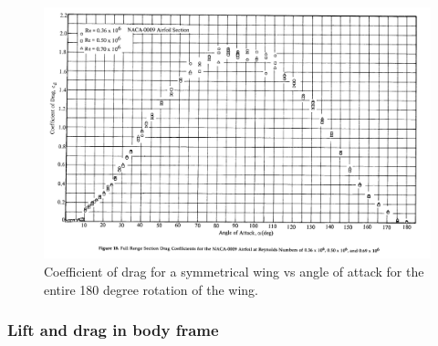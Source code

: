 \begin{figure}[h]
    \center
    \includegraphics[scale=0.15]{drag180.png}
    \caption{Coefficient of drag for a symmetrical wing vs angle of attack for the entire 180 degree rotation of the wing.}
    \label{drag}
\end{figure}


\subsubsection{Lift and drag in body frame}

